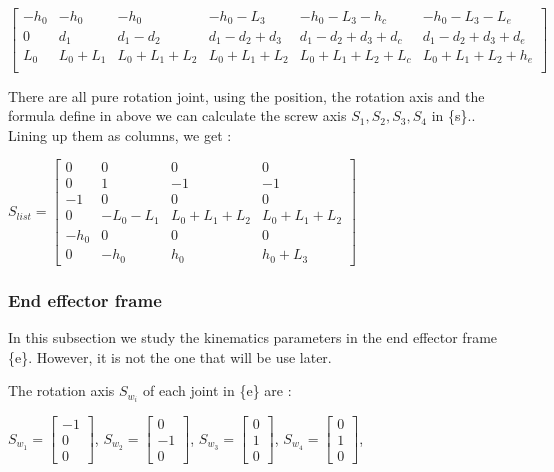 \begin{center}
    $
    \begin{bmatrix}
        -h_0 & -h_0 & -h_0 & -h_0-L_3 & -h_0-L_3-h_c & -h_0-L_3-L_e  \\
        0 & d_1 & d_1-d_2 & d_1-d_2+d_3 & d_1-d_2+d_3+d_c & d_1-d_2+d_3+d_e \\
        L_0 & L_0+L_1 & L_0+L_1+L_2 & L_0+L_1+L_2 & L_0+L_1+L_2+L_c & L_0+L_1+L_2+h_e \\
    \end{bmatrix}
    $
\end{center}

\bigbreak
There are all pure rotation joint, using the position, the rotation axis and the formula define in above we can calculate the screw axis $S_1,S_2,S_3,S_4$ in \{s\}.. Lining up them as columns, we get : 

\begin{center}
    $S_{list} = 
    \begin{bmatrix}
        0 & 0 & 0 & 0 \\
        0 & 1 & -1 & -1 \\
        -1 & 0 & 0 & 0 \\
        0 & -L_0-L_1 & L_0+L_1+L_2 & L_0+L_1+L_2 \\
        -h_0 & 0 & 0 & 0 \\
        0 & -h_0 & h_0 & h_0+L_3
    \end{bmatrix}
    $
\end{center}

\subsubsection{End effector frame}

In this subsection we study the kinematics parameters in the end effector frame \{e\}. However, it is not the one that will be use later. 

\bigbreak
The rotation axis $S_{w_i}$ of each joint  in \{e\} are : 
\begin{center}
    $S_{w_1} = \begin{bmatrix} -1 \\ 0 \\ 0\end{bmatrix}$,
    $S_{w_2} = \begin{bmatrix} 0 \\ -1 \\ 0\end{bmatrix}$,
    $S_{w_3} = \begin{bmatrix} 0 \\ 1 \\ 0\end{bmatrix}$,
    $S_{w_4} = \begin{bmatrix} 0 \\ 1 \\ 0\end{bmatrix}$,
\end{center}

